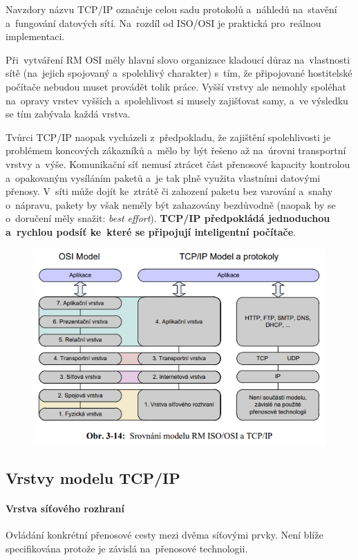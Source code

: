 Navzdory názvu TCP/IP označuje celou sadu protokolů a~náhledů na~stavění a~fungování datových sítí. Na~rozdíl od ISO/OSI je praktická pro~reálnou implementaci.

Při~vytváření RM OSI měly hlavní slovo organizace kladoucí důraz na~vlastnosti sítě (na~jejich spojovaný a~spolehlivý charakter) s~tím, že připojované hostitelské počítače nebudou muset provádět tolik práce. Vyšší vrstvy ale nemohly spoléhat na~opravy vrstev vyšších a~spolehlivost si musely zajišťovat samy, a~ve výsledku se tím zabývala každá vrstva.

Tvůrci TCP/IP naopak vycházeli z~předpokladu, že zajištění spolehlivosti je problémem koncových zákazníků a~mělo by být řešeno až na~úrovni transportní vrstvy a~výše. Komunikační síť nemusí ztrácet část přenosové kapacity kontrolou a~opakovaným vysíláním paketů a~je tak plně využita vlastními datovými přenosy. V~síti může dojít ke~ztrátě či zahození paketu bez varování a~snahy o~nápravu, pakety by však neměly být zahazovány bezdůvodně (naopak by se o~doručení měly snažit: \emph{best effort}). \textbf{TCP/IP předpokládá jednoduchou a~rychlou podsíť ke~které se připojují inteligentní počítače}.

\begin{figure}[ht]
	\centering
	\includegraphics[width=\textwidth]{images/q03_osi_tcp}
\end{figure}

\subsection{Vrstvy modelu TCP/IP}

\paragraph{Vrstva síťového rozhraní} Ovládání konkrétní přenosové cesty mezi dvěma síťovými prvky. Není blíže specifikována protože je závislá na~přenosové technologii.

